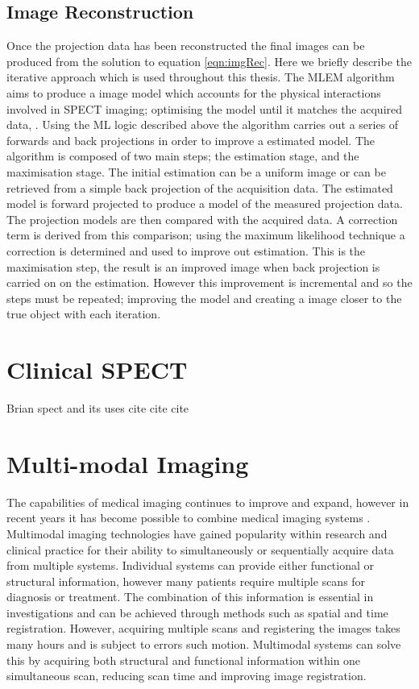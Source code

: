 \subsection{Image Reconstruction}
Once the projection data has been reconstructed the final images can be produced from the solution to equation \ref{eqn:imgRec}. Here we briefly describe the iterative approach which is used throughout this thesis. The \acrlong{MLEM} algorithm aims to produce a image model which accounts for the physical interactions involved in \acrshort{SPECT} imaging; optimising the model until it matches the acquired data, \cite{4307558}. Using the \acrshort{ML} logic described above the algorithm carries out a series of forwards and back projections in order to improve a estimated model. The algorithm is composed of two main steps; the estimation stage, and the maximisation stage. The initial estimation can be a uniform image or can be retrieved from a simple back projection of the acquisition data. The estimated model is forward projected to produce a model of the measured projection data. The projection models are then compared with the acquired data. A correction term is derived from this comparison; using the maximum likelihood technique a correction is determined and used to improve out estimation. This is the maximisation step, the result is an improved image when back projection is carried on on the estimation. However this improvement is incremental and so the steps must be repeated; improving the model and creating a image closer to the true object with each iteration.  

\section{Clinical SPECT}
Brian spect and its uses cite cite cite 

\section{Multi-modal Imaging} %
The capabilities of medical imaging continues to improve and expand, however in recent years it has become possible to combine medical imaging systems \cite{PATTON2009247}. Multimodal imaging technologies have gained popularity within research and clinical practice for their ability to simultaneously or sequentially acquire data from multiple systems. Individual systems can provide either functional or structural information, however many patients require multiple scans for diagnosis or treatment. The combination of this information is essential in investigations and can be achieved through methods such as spatial and time registration. However, acquiring multiple scans and registering the images takes many hours and is subject to errors such motion. Multimodal systems can solve this by acquiring both structural and functional information within one simultaneous scan, reducing scan time and improving image registration. 

